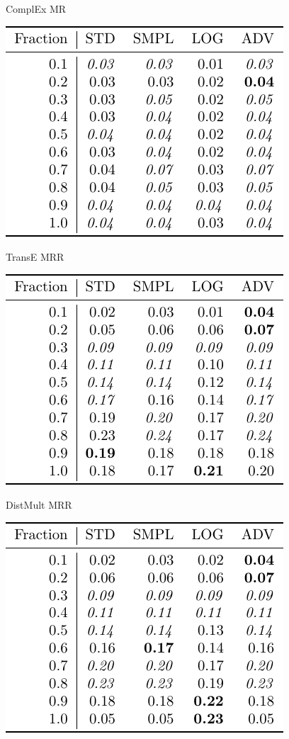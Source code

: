 \documentclass{article}
\begin{document}
\begin{figure}
\caption{ComplEx MR}
\end{figure}\begin{figure}
\includegraphics[]{results_TransE_MRR}\\
\caption{TransE MRR}
\end{figure}\begin{figure}
\includegraphics[]{results_DistMult_MRR}\\
\caption{DistMult MRR}
\end{figure}\begin{figure}
\includegraphics[]{results_ComplEx_MRR}\\

\end{figure}
\end{document}
